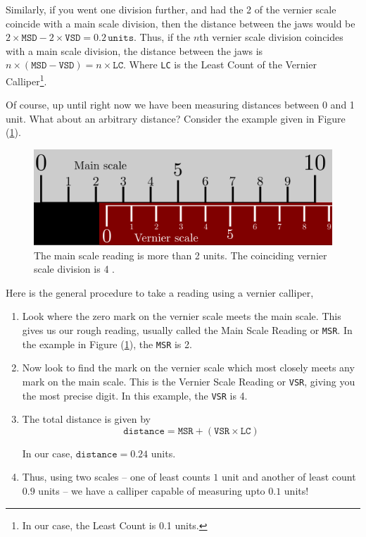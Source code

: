 Similarly, if you went one division further, and had the 2 of the vernier scale coincide with a main scale division, then the distance between the jaws would be $2\times\texttt{MSD}-2\times\texttt{VSD}=0.2\, \texttt{units}$. Thus, if the $n$th vernier scale division coincides with a main scale division, the distance between the jaws is $n \times (\texttt{MSD}-\texttt{VSD})=n \times \texttt{LC}$. Where \texttt{LC} is the Least Count of the Vernier Calliper\footnote{In our case, the Least Count is 0.1 units.}.

Of course, up until right now we have been measuring distances between 0 and 1 unit.  What about an arbitrary distance? Consider the example given in Figure (\ref{fig:vernier_4}). 

\begin{figure}[!htb]
    \centering
    \includegraphics[scale=0.75]{figs/vernier4.png}
    \caption{The main scale reading is more than 2 units. The coinciding vernier scale division is 4 . }
    \label{fig:vernier_4}
\end{figure}

Here is the general procedure to take a reading using a vernier calliper,

\begin{enumerate}
    \item Look where the zero mark on the vernier scale meets the main scale. This gives us our rough reading, usually called the Main Scale Reading or \texttt{MSR}. In the example in Figure (\ref{fig:vernier_4}), the \texttt{MSR} is 2.
    
    \item Now look to find the mark on the vernier scale which most closely meets any mark on the main scale. This is the Vernier Scale Reading or \texttt{VSR}, giving you the most precise digit. In this example, the \texttt{VSR} is 4.
    
    \item The total distance is given by 
    $$\texttt{distance} = \texttt{MSR} + \left(\texttt{VSR}\times\texttt{LC}\right)$$
    
    In our case, $\texttt{distance} = 0.24$ units.
    
    \item Thus, using two scales -- one of least counts $1$ unit and another of least count $0.9$ units -- we have a calliper capable of measuring upto $0.1$ units!
\end{enumerate}

